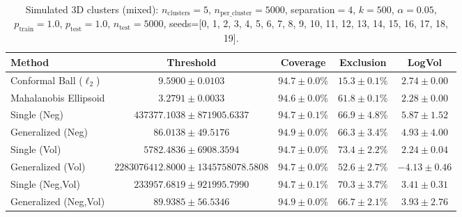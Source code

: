 \begin{table}[h!]
\centering
\caption{Simulated 3D clusters (mixed): $n_\mathrm{clusters}=5$, $n_\mathrm{per\_cluster}=5000$, separation$=4$, $k=500$, $\alpha=0.05$, $p_\mathrm{train}=1.0$, $p_\mathrm{test}=1.0$, $n_\mathrm{test}=5000$, seeds=[0, 1, 2, 3, 4, 5, 6, 7, 8, 9, 10, 11, 12, 13, 14, 15, 16, 17, 18, 19].}
\tiny
\begin{tabular}{lcccc}
\toprule
\textbf{Method} & \textbf{Threshold} & \textbf{Coverage} & \textbf{Exclusion} & \textbf{LogVol} \\
\midrule
Conformal Ball ($\ell_2$) 
& $9.5900 \pm 0.0103$ 
& $94.7 \pm 0.0$\% 
& $15.3 \pm 0.1$\% 
& $2.74 \pm 0.00$ \\
Mahalanobis Ellipsoid 
& $3.2791 \pm 0.0033$ 
& $94.6 \pm 0.0$\% 
& $61.8 \pm 0.1$\% 
& $2.28 \pm 0.00$ \\
Single (Neg) 
& $437377.1038 \pm 871905.6337$ 
& $94.7 \pm 0.1$\% 
& $66.9 \pm 4.8$\% 
& $5.87 \pm 1.52$ \\
Generalized (Neg) 
& $86.0138 \pm 49.5176$ 
& $94.9 \pm 0.0$\% 
& $66.3 \pm 3.4$\% 
& $4.93 \pm 4.00$ \\
Single (Vol) 
& $5782.4836 \pm 6908.3594$ 
& $94.7 \pm 0.0$\% 
& $73.4 \pm 2.2$\% 
& $2.24 \pm 0.04$ \\
Generalized (Vol) 
& $2283076412.8000 \pm 1345758078.5808$ 
& $94.7 \pm 0.0$\% 
& $52.6 \pm 2.7$\% 
& $-4.13 \pm 0.46$ \\
Single (Neg,Vol) 
& $233957.6819 \pm 921995.7990$ 
& $94.7 \pm 0.1$\% 
& $70.3 \pm 3.7$\% 
& $3.41 \pm 0.31$ \\
Generalized (Neg,Vol) 
& $89.9385 \pm 56.5346$ 
& $94.9 \pm 0.0$\% 
& $66.7 \pm 2.1$\% 
& $3.93 \pm 2.76$ \\
\bottomrule
\end{tabular}
\end{table}
